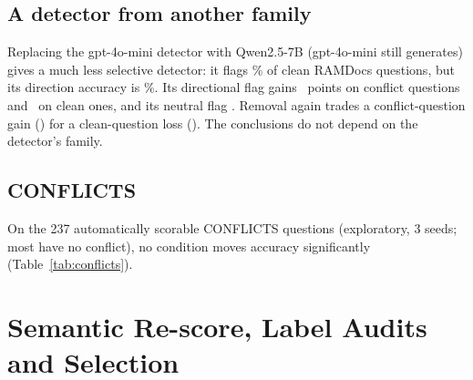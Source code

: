 \subsection{A detector from another family}
Replacing the gpt-4o-mini detector with Qwen2.5-7B (gpt-4o-mini still generates) gives a much less selective
detector: it flags \qdetFpr\% of clean RAMDocs questions, but its direction accuracy is \qdetDir\%. Its directional
flag gains \zQDetLlmDirFlagDirectionalConflict\ points on conflict questions and \zQDetLlmDirFlagDirectionalClean\ on
clean ones, and its neutral flag \zQDetLlmDirFlagConflict. Removal again trades a conflict-question gain
(\zQDetLlmDirRemoveSuspectConflict) for a clean-question loss (\zQDetLlmDirRemoveSuspectClean). The conclusions do
not depend on the detector's family.

\subsection{CONFLICTS}
On the 237 automatically scorable CONFLICTS questions (exploratory, 3 seeds; most have no conflict), no condition
moves accuracy significantly (Table~\ref{tab:conflicts}).

\section{Semantic Re-score, Label Audits and Selection}
\label{app:semantic}

